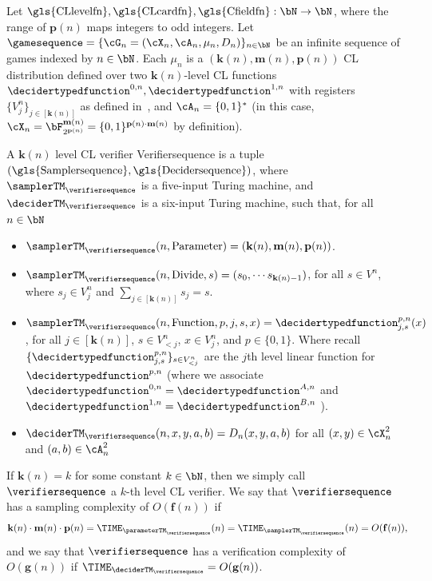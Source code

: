 \begin{definition} \label{def:CLverifier}
	Let $\text{\gls{CLlevelfn}}, \text{\gls{CLcardfn}}, \text{\gls{Cfieldfn}}: \bN \rightarrow \bN$, where the range of $\mathbf{p}(n)$ maps integers to odd integers. Let $\gamesequence = \{\cG_n = (\cX_n, \cA_n, \mu_n, D_n)\}_{n \in \bN}$ be an infinite sequence of games indexed by $n \in \bN$. Each $\mu_n$ is a $(\mathbf{k}(n), \mathbf{m}(n), \mathbf{p}(n))$ CL distribution defined over two $\mathbf{k}(n)$-level CL functions $\decidertypedfunction^{0,n}, \decidertypedfunction^{1,n}$ with registers $\{ V^n_j \}_{j \in [\mathbf{k}(n)]}$ as defined in~, and $\cA_n = \{0,1\}^*$ (in this case, $\cX_n = \bF_{2^{\mathbf{p}(n)}}^{\mathbf{m}(n)}= \{0,1\}^{\mathbf{p}(n) \cdot \mathbf{m}(n)}$ by definition).
	
	A $\mathbf{k}(n)$ level CL verifier \gls{Verifiersequence} is a tuple $(\text{\gls{Samplersequence}}, \text{\gls{Decidersequence}})$, where $\samplerTM_{\verifiersequence}$ is a five-input Turing machine,  and $\deciderTM_{\verifiersequence}$ is a six-input Turing machine, such that, for all $n \in \bN$
	\begin{itemize}
		\item $\samplerTM_{\verifiersequence}(n, \text{Parameter}) = (\mathbf{k}(n), \mathbf{m}(n) , \mathbf{p}(n))$. 
		\item $\samplerTM_{\verifiersequence}(n, \text{Divide},s) = (s_0, \cdots s_{\mathbf{k}(n)-1})$, for all $s \in V^n$, where $s_j \in V_j^n$ and $\sum_{j \in [\mathbf{k}(n)]} s_j = s$.
		\item $\samplerTM_{\verifiersequence}(n, \text{Function},p,j,s,x) = \decidertypedfunction_{j, s}^{p,n}(x)$, for all $j \in [\mathbf{k}(n)]$, $s \in V_{< j}^n$,  $x \in V_j^n$, and $p\in \{0,1\}$. Where recall $\{\decidertypedfunction_{j, s}^{p,n}\}_{s \in V^n_{< j}}$ are the $j$th level linear function for $\decidertypedfunction^{p,n}$ (where we associate $\decidertypedfunction^{0,n} = \decidertypedfunction^{A,n}$ and $\decidertypedfunction^{1,n} = \decidertypedfunction^{B,n} $ ).
		\item $\deciderTM_\verifiersequence(n,x,y,a,b)= D_n(x,y,a,b)$ for all $(x,y) \in \cX_n^2$ and $(a,b) \in \cA_n^2$
	\end{itemize}
	If $\mathbf{k}(n) = k$ for some constant $k \in \bN$, then we simply call $\verifiersequence$ a $k$-th level CL verifier. We say that $\verifiersequence$ has a sampling complexity of $O(\mathbf{f}(n))$ if 
	\begin{equation*}
		\mathbf{k}(n) \cdot \mathbf{m}(n) \cdot \mathbf{p}(n) = \TIME_{\parameterTM_{\verifiersequence}}(n)= \TIME_{\samplerTM_{\verifiersequence}}(n) = O(\mathbf{f}(n)),
	\end{equation*}
	and we say that $\verifiersequence$ has a verification complexity of $O(\mathbf{g}(n))$ if $\TIME_{\deciderTM_{\verifiersequence}} = O(\mathbf{g}(n))$.
\end{definition}

